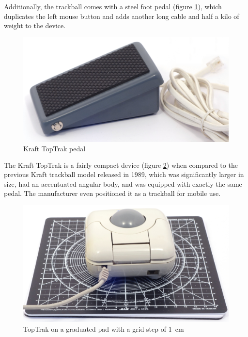 \documentclass[11pt, a4paper]{article}
\begin{document}
Additionally, the trackball comes with a steel foot pedal (figure \ref{fig:TopTrakPedal}), which duplicates the left mouse button and adds another long cable and half a kilo of weight to the device.

\begin{figure}[h]
    \centering
    \includegraphics[scale=0.45]{1990_kraft_toptrack/pedal_30.jpg}
    \caption{Kraft TopTrak pedal}
    \label{fig:TopTrakPedal}
\end{figure}


The Kraft TopTrak is a fairly compact device (figure \ref{fig:TopTrakSize}) when compared to the previous Kraft trackball model released in 1989, which was significantly larger in size, had an accentuated angular body, and was equipped with exactly the same pedal. The manufacturer even positioned it as a trackball for mobile use.

\begin{figure}[h]
    \centering
    \includegraphics[scale=0.35]{1990_kraft_toptrack/2.6_30.jpg}
    \caption{TopTrak on a graduated pad with a grid step of 1~cm}
    \label{fig:TopTrakSize}
\end{figure}
\end{document}
